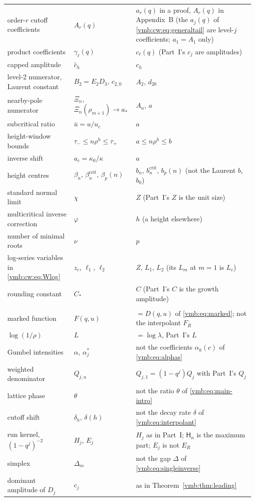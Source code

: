 \documentclass[11pt,a4paper]{article}
\numberwithin{equation}{section}
\theoremstyle{definition}\newtheorem{definition}[theorem]{Definition}
\theoremstyle{remark}\newtheorem{remark}[theorem]{Remark}
\begin{document}
\begin{longtable}{@{}>{\raggedright\arraybackslash}p{}>{\raggedright\arraybackslash}p{}>{\raggedright\arraybackslash}p{}@{}}
order-$r$ cutoff coefficients & $A_r(q)$ & $a_r(q)$ in a proof, $A_r(q)$ in Appendix~B (the $a_j(q)$ of \eqref{vmb:cw:eq:generaltail} are level-$j$ coefficients; $a_1=A_1$ only)\\
product coefficients & $\gamma_\ell(q)$ & $c_\ell(q)$ (Part~I's $c_j$ are amplitudes)\\
capped amplitude & $\hat c_h$ & $c_h$\\
level-2 numerator, Laurent constant & $B_2=E_2D_3$, $c_{2,0}$ & $A_2$, $d_{20}$\\
nearby-pole numerator & $\Xi_n$, $\Xi_n(\rho_{m+1})\to a_*$ & $A_n$, $a$\\
subcritical ratio & $\bar u=u/u_c$ & $a$\\
height-window bounds & $\tau_-\le n\rho^h\le\tau_+$ & $a\le n\rho^h\le b$\\
inverse shift & $a_c=\kappa_0/\kappa$ & $a$\\
height centres & $\beta_n$, $\beta_n^{\mathrm{crit}}$, $\beta_p(n)$ & $b_n$, $b_n^{\mathrm{crit}}$, $b_p(n)$ (not the Laurent $b$, $b_0$)\\
standard normal limit & $\chi$ & $Z$ (Part~I's $Z$ is the unit size)\\
multicritical inverse correction & $\varphi$ & $h$ (a height elsewhere)\\
number of minimal roots & $\nu$ & $p$\\
log-series variables in \eqref{vmb:cw:eq:Wlog} & $z_c$, $\ell_1$, $\ell_2$ & $Z$, $L_1$, $L_2$ (its $L_m$ at $m=1$ is $L_c$)\\
rounding constant & $C_*$ & $C$ (Part~I's $C$ is the growth amplitude)\\
\midrule
\multicolumn{3}{@{}l}{\emph{Kept, with a warning}}\\
marked function & $F(q,u)$ & $=D(q,u)$ of \eqref{vmb:eq:marked}; not the interpolant $F_R$\\
$\log(1/\rho)$ & $L$ & $=\log\lambda$, Part~I's $L$\\
Gumbel intensities & $\alpha$, $\alpha_j^*$ & not the coefficients $\alpha_k(c)$ of \eqref{vmb:eq:alphas}\\
weighted denominator & $Q_{j,u}$ & $Q_{j,1}=(1-q^j)Q_j$ with Part~I's $Q_j$\\
lattice phase & $\theta$ & not the ratio $\theta$ of \eqref{vmb:eq:main-intro}\\
cutoff shift & $\delta_h$, $\delta(h)$ & not the decay rate $\delta$ of \eqref{vmb:eq:interpolant}\\
run kernel, $(1-q^j)^{-2}$ & $H_j$, $E_j$ & $H_j$ as in Part~I; $\mathsf H_n$ is the maximum part; $E_j$ is not $E_R$\\
simplex & $\Delta_m$ & not the gap $\Delta$ of \eqref{vmb:eq:singleinverse}\\
dominant amplitude of $D_j$ & $c_j$ & as in Theorem~\ref{vmb:thm:leading}\\
\bottomrule
\end{longtable}
\end{document}

